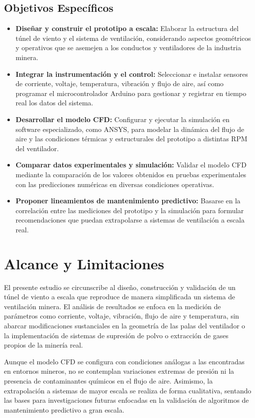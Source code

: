 \subsection{Objetivos Específicos}
\begin{itemize}
    \item \textbf{Diseñar y construir el prototipo a escala:} Elaborar la estructura del túnel de viento y el sistema de ventilación, considerando aspectos geométricos y operativos que se asemejen a los conductos y ventiladores de la industria minera.
    \item \textbf{Integrar la instrumentación y el control:} Seleccionar e instalar sensores de corriente, voltaje, temperatura, vibración y flujo de aire, así como programar el microcontrolador Arduino para gestionar y registrar en tiempo real los datos del sistema.
    \item \textbf{Desarrollar el modelo CFD:} Configurar y ejecutar la simulación en software especializado, como ANSYS, para modelar la dinámica del flujo de aire y las condiciones térmicas y estructurales del prototipo a distintas RPM del ventilador.
    \item \textbf{Comparar datos experimentales y simulación:} Validar el modelo CFD mediante la comparación de los valores obtenidos en pruebas experimentales con las predicciones numéricas en diversas condiciones operativas.
    \item \textbf{Proponer lineamientos de mantenimiento predictivo:} Basarse en la correlación entre las mediciones del prototipo y la simulación para formular recomendaciones que puedan extrapolarse a sistemas de ventilación a escala real.
\end{itemize}

\newpage
\section{Alcance y Limitaciones}
El presente estudio se circunscribe al diseño, construcción y validación de un túnel de viento a escala que reproduce de manera simplificada un sistema de ventilación minera. El análisis de resultados se enfoca en la medición de parámetros como corriente, voltaje, vibración, flujo de aire y temperatura, sin abarcar modificaciones sustanciales en la geometría de las palas del ventilador o la implementación de sistemas de supresión de polvo o extracción de gases propios de la minería real. 

Aunque el modelo CFD se configura con condiciones análogas a las encontradas en entornos mineros, no se contemplan variaciones extremas de presión ni la presencia de contaminantes químicos en el flujo de aire. Asimismo, la extrapolación a sistemas de mayor escala se realiza de forma cualitativa, sentando las bases para investigaciones futuras enfocadas en la validación de algoritmos de mantenimiento predictivo a gran escala.